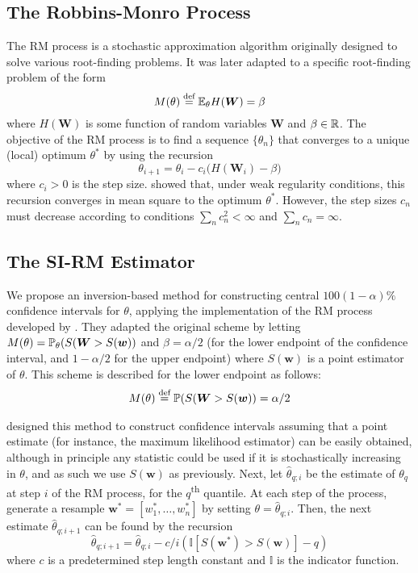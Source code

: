 \subsection{The Robbins-Monro Process}

The RM process is a stochastic approximation algorithm originally designed to solve various root-finding problems. It was later adapted to a specific root-finding problem of the form \cite{Fu2015} \[
M(\theta) \overset{\text{def}}{=} \mathbb{E}_\theta H(\bm{W}) = \beta
\] where $H(\bm{W})$ is some function of random variables $\bm{W}$ and $\beta \in \mathbb{R}$. The objective of the RM process is to find a sequence $\{\theta_n\}$ that converges to a unique (local) optimum $\theta^*$ by using the recursion \cite{LlyodBotev2015}
\[ \theta_{i+1} = \theta_i - c_i \Big( H(\bm{W}_i) - \beta \Big) \]
where $c_i > 0$ is the step size. \citet{RobbinsMonro1951} showed that, under weak regularity conditions, this recursion converges in mean square to the optimum $\theta^*$. However, the step sizes $c_n$ must decrease according to conditions $\sum_nc_n^2 < \infty$ and $\sum_n c_n = \infty$.

\subsection{The SI-RM Estimator}

We propose an inversion-based method for constructing central $100(1-\alpha)\%$ confidence intervals for $\theta$, applying the implementation of the RM process developed by \citet{Garthwaite1992}. They adapted the original scheme by letting $M(\theta) = \mathbb{P}_\theta(S(\bm{W} > S(\bm{w}))$ and $\beta = \alpha/2$ (for the lower endpoint of the confidence interval, and $1-\alpha/2$ for the upper endpoint) where $S(\bm{w})$ is a point estimator of $\theta$. This scheme is described for the lower endpoint as follows:
\begin{align*}
    M(\theta) \overset{\text{def}}{=} \mathbb{P}(S(\bm{W} > S(\bm{w})) = \alpha/2
\end{align*}

\citet{Garthwaite1992} designed this method to construct confidence intervals assuming that a point estimate (for instance, the maximum likelihood estimator) can be easily obtained, although in principle any statistic could be used if it is stochastically increasing in $\theta$, and as such we use $S(\bm{w})$ as previously. Next, let $\hat\theta_{q; i}$ be the estimate of $\theta_q$ at step $i$ of the RM process, for the $q$\textsuperscript{th} quantile. At each step of the process, generate a resample $\bm{w}^* = [w_1^*, \dots, w_n^*]$ by setting $\theta = \hat\theta_{q; i}$. Then, the next estimate $\hat\theta_{q; i+1}$ can be found by the recursion
\begin{equation}\label{eqn: SIRM-recursion}
    \hat\theta_{q; i+1} = \hat\theta_{q; i} - c/i \left( \mathbb{I}\left[S(\bm{w^*}) > S(\bm{w})\right] - q \right)
\end{equation}
where $c$ is a predetermined step length constant and $\mathbb{I}$ is the indicator function.

